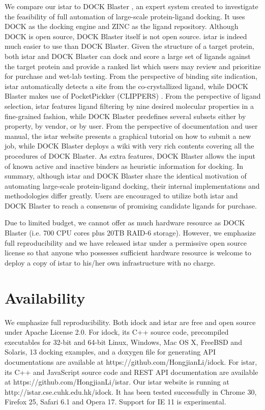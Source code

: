 We compare our istar to DOCK Blaster \cite{557}, an expert system created to investigate the feasibility of full automation of large-scale protein-ligand docking. It uses DOCK \cite{1222} as the docking engine and ZINC \cite{532,1178} as the ligand repository. Although DOCK is open source, DOCK Blaster itself is not open source. istar is indeed much easier to use than DOCK Blaster. Given the structure of a target protein, both istar and DOCK Blaster can dock and score a large set of ligands against the target protein and provide a ranked list which users may review and prioritize for purchase and wet-lab testing. From the perspective of binding site indication, istar automatically detects a site from the co-crystallized ligand, while DOCK Blaster makes use of PocketPickker (CLIPPERS) \cite{395}. From the perspective of ligand selection, istar features ligand filtering by nine desired molecular properties in a fine-grained fashion, while DOCK Blaster predefines several subsets either by property, by vendor, or by user. From the perspective of documentation and user manual, the istar website presents a graphical tutorial on how to submit a new job, while DOCK Blaster deploys a wiki with very rich contents covering all the procedures of DOCK Blaster. As extra features, DOCK Blaster allows the input of known active and inactive binders as heuristic information for docking. In summary, although istar and DOCK Blaster share the identical motivation of automating large-scale protein-ligand docking, their internal implementations and methodologies differ greatly. Users are encouraged to utilize both istar and DOCK Blaster to reach a consensus of promising candidate ligands for purchase.

Due to limited budget, we cannot offer as much hardware resource as DOCK Blaster (i.e. 700 CPU cores plus 20TB RAID-6 storage). However, we emphasize full reproducibility and we have released istar under a permissive open source license so that anyone who possesses sufficient hardware resource is welcome to deploy a copy of istar to his/her own infrastructure with no charge.

\section{Availability}

We emphasize full reproducibility. Both idock and istar are free and open source under Apache License 2.0. For idock, its C++ source code, precompiled executables for 32-bit and 64-bit Linux, Windows, Mac OS X, FreeBSD and Solaris, 13 docking examples, and a doxygen file for generating API documentations are available at https://github.com/HongjianLi/idock. For istar, its C++ and JavaScript source code and REST API documentation are available at https://github.com/HongjianLi/istar. Our istar website is running at http://istar.cse.cuhk.edu.hk/idock. It has been tested successfully in Chrome 30, Firefox 25, Safari 6.1 and Opera 17. Support for IE 11 is experimental.

